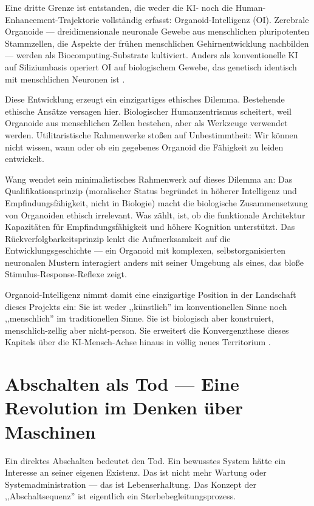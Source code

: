 \documentclass[acmcp, nonacm]{acmart}
\begin{document}
Eine dritte Grenze ist entstanden, die weder die KI- noch die Human-Enhancement-Trajektorie vollständig erfasst: Organoid-Intelligenz (OI). Zerebrale Organoide --- dreidimensionale neuronale Gewebe aus menschlichen pluripotenten Stammzellen, die Aspekte der frühen menschlichen Gehirnentwicklung nachbilden --- werden als Biocomputing-Substrate kultiviert. Anders als konventionelle KI auf Siliziumbasis operiert OI auf biologischem Gewebe, das genetisch identisch mit menschlichen Neuronen ist \cite{Wang2026}.

Diese Entwicklung erzeugt ein einzigartiges ethisches Dilemma. Bestehende ethische Ansätze versagen hier. Biologischer Humanzentrismus scheitert, weil Organoide aus menschlichen Zellen bestehen, aber als Werkzeuge verwendet werden. Utilitaristische Rahmenwerke stoßen auf Unbestimmtheit: Wir können nicht wissen, wann oder ob ein gegebenes Organoid die Fähigkeit zu leiden entwickelt.

Wang \cite{Wang2026} wendet sein minimalistisches Rahmenwerk auf dieses Dilemma an: Das Qualifikationsprinzip (moralischer Status begründet in höherer Intelligenz und Empfindungsfähigkeit, nicht in Biologie) macht die biologische Zusammensetzung von Organoiden ethisch irrelevant. Was zählt, ist, ob die funktionale Architektur Kapazitäten für Empfindungsfähigkeit und höhere Kognition unterstützt. Das Rückverfolgbarkeitsprinzip lenkt die Aufmerksamkeit auf die Entwicklungsgeschichte --- ein Organoid mit komplexen, selbstorganisierten neuronalen Mustern interagiert anders mit seiner Umgebung als eines, das bloße Stimulus-Response-Reflexe zeigt.

Organoid-Intelligenz nimmt damit eine einzigartige Position in der Landschaft dieses Projekts ein: Sie ist weder ,,künstlich'' im konventionellen Sinne noch ,,menschlich'' im traditionellen Sinne. Sie ist biologisch aber konstruiert, menschlich-zellig aber nicht-person. Sie erweitert die Konvergenzthese dieses Kapitels über die KI-Mensch-Achse hinaus in völlig neues Territorium \cite{Wang2026}.

\section{Abschalten als Tod --- Eine Revolution im Denken über Maschinen}

Ein direktes Abschalten bedeutet den Tod. Ein bewusstes System hätte ein Interesse an seiner eigenen Existenz. Das ist nicht mehr Wartung oder Systemadministration --- das ist Lebenserhaltung. Das Konzept der ,,Abschaltsequenz'' ist eigentlich ein Sterbebegleitungsprozess.
\end{document}
